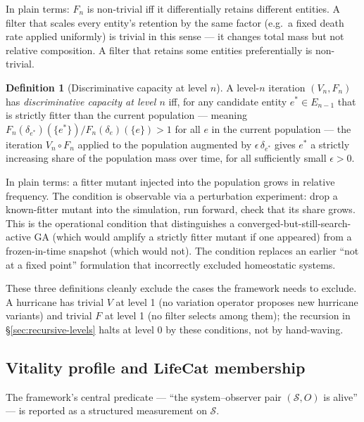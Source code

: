 \documentclass[journal]{IEEEtran}
\theoremstyle{plain}
\theoremstyle{definition}
\newtheorem{definition}[theorem]{Definition}
\theoremstyle{plain}
\begin{document}
In plain terms: $F_n$ is non-trivial iff it differentially retains
different entities. A filter that scales every entity's retention by the
same factor (e.g.\ a fixed death rate applied uniformly) is trivial in
this sense --- it changes total mass but not relative composition. A
filter that retains some entities preferentially is non-trivial.

\begin{definition}[Discriminative capacity at level $n$]\label{def:disc-cap}
A level-$n$ iteration $(V_n, F_n)$ has \emph{discriminative capacity at
level $n$} iff, for any candidate entity $e^\ast \in E_{n-1}$ that is
strictly fitter than the current population --- meaning
$F_n(\delta_{e^\ast})(\{e^\ast\}) / F_n(\delta_e)(\{e\}) > 1$ for all
$e$ in the current population --- the iteration $V_n \circ F_n$ applied
to the population augmented by $\epsilon\,\delta_{e^\ast}$ gives
$e^\ast$ a strictly increasing share of the population mass over time,
for all sufficiently small $\epsilon > 0$.
\end{definition}

In plain terms: a fitter mutant injected into the population grows in
relative frequency. The condition is observable via a perturbation
experiment: drop a known-fitter mutant into the simulation, run forward,
check that its share grows. This is the operational condition that
distinguishes a converged-but-still-search-active GA (which would
amplify a strictly fitter mutant if one appeared) from a frozen-in-time
snapshot (which would not). The condition replaces an earlier
``not at a fixed point'' formulation that incorrectly excluded
homeostatic systems.

These three definitions cleanly exclude the cases the framework needs
to exclude. A hurricane has trivial $V$ at level 1 (no variation
operator proposes new hurricane variants) and trivial $F$ at level 1
(no filter selects among them); the recursion in
\S\ref{sec:recursive-levels} halts at level 0 by these conditions, not
by hand-waving.

\subsection{Vitality profile and $\mathbf{LifeCat}$ membership}\label{sec:vitality}

The framework's central predicate ---  ``the system--observer pair
$(\mathcal{S}, O)$ is alive'' --- is reported as a structured
measurement on $\mathcal{S}$.
\end{document}
